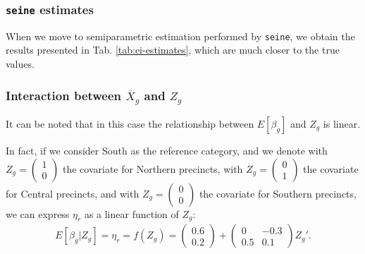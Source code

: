 \subsubsection{\texttt{seine} estimates}

When we move to semiparametric estimation performed by \texttt{seine}, we obtain the results presented in Tab. \ref{tab:ei-estimates}, which are much closer to the true values.



\subsubsection{Interaction between $\overline{X}_g$ and $Z_g$}

It can be noted that in this case the relationship between $E[\beta_g]$ and $Z_g$ is linear.

In fact, if we consider South as the reference category, and we denote with $Z_g = \begin{pmatrix}
    1 \\
    0
\end{pmatrix}$ the covariate for Northern precincts, with $Z_g = \begin{pmatrix}
    0 \\
    1
\end{pmatrix}$ the covariate for Central precincts, and with $Z_g = \begin{pmatrix}
    0 \\
    0
\end{pmatrix}$ the covariate for Southern precincts, we can express $\eta_r$ as a linear function of $Z_g$:
\begin{align*}
E[\beta_g|Z_g] = \eta_{r} = f(Z_g) =  \begin{pmatrix}
    0.6 \\
    0.2
    \end{pmatrix} +
    \begin{pmatrix}
    0 & -0.3\\ 
    0.5 & 0.1
\end{pmatrix} Z_g'.
\end{align*}



